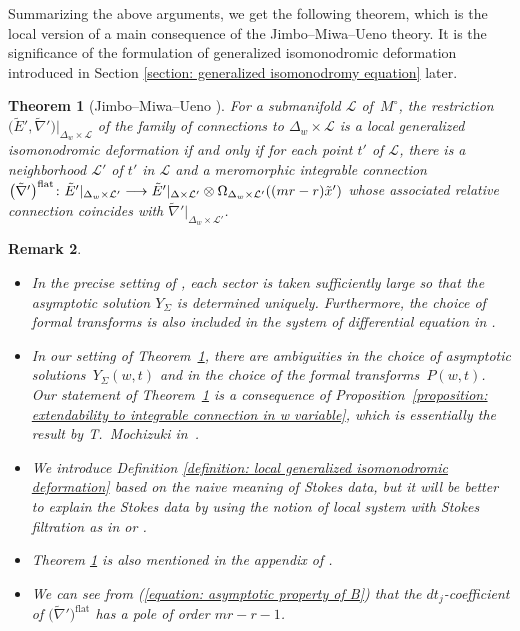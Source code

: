 \documentclass[pdftex]{sigma}
\numberwithin{equation}{section}
\newtheorem{Theorem}{Theorem}[section]
\newtheorem{Remark}[Theorem]{Remark}
\begin{document}
Summarizing the above arguments, we get the following theorem,
which is the local version of a main consequence of the Jimbo--Miwa--Ueno theory.
It is the significance of
the formulation of generalized isomonodromic deformation
introduced in Section \ref{section: generalized isomonodromy equation} later.

\begin{Theorem}[Jimbo--Miwa--Ueno {\cite[Theorems 3.1 and 3.3]{Jimbo-Miwa-Ueno}}]
\label{theorem: Jimbo-Miwa-Ueno equation}
For a submanifold ${\mathcal L}$ of~$M^{\circ}$,
the restriction
$\big(\tilde{E}',\tilde{\nabla}'\big)|_{\Delta_w\times{\mathcal L}}$
of the family of connections to $\Delta_w\times{\mathcal L}$
is a local generalized isomonodromic deformation
if and only if
for each point $t'$ of ${\mathcal L}$, there is a neighborhood ${\mathcal L'}$
of $t'$ in ${\mathcal L}$ and a meromorphic integrable connection
$\big(\tilde{\nabla}'\big)^{\rm flat}\colon \tilde{E}'|_{\Delta_w\times{\mathcal L'}} \longrightarrow
\tilde{E}'|_{\Delta\times{\mathcal L'}}\otimes\Omega_{\Delta_w\times{\mathcal L'}}((mr-r)\tilde{x}')$
whose associated relative connection coincides with
$\tilde{\nabla}'|_{\Delta_w\times{\mathcal L'}}$.
\end{Theorem}

\begin{Remark}\quad
\begin{itemize}\itemsep=0pt
\item[(i)]
In the precise setting of \cite{Jimbo-Miwa-Ueno}, each sector is taken sufficiently large
so that the asymptotic solution $Y_{\Sigma}$ is determined uniquely.
Furthermore, the choice of formal transforms is also included in the system of
differential equation in \cite[Theorems 3.1 and~3.3]{Jimbo-Miwa-Ueno}.
\item[(ii)]
In our setting of Theorem~\ref{theorem: Jimbo-Miwa-Ueno equation},
there are ambiguities in the choice of asymptotic solutions~$Y_{\Sigma}(w,t)$
and in the choice of the formal transforms~$P(w,t)$.
Our statement of Theorem~\ref{theorem: Jimbo-Miwa-Ueno equation}
is a consequence of Proposition~\ref{proposition: extendability to integrable connection in w variable},
which is essentially the result by T.~Mochizuki in~\cite{Mochizuki}.
\item[(iii)] We introduce Definition \ref{definition: local generalized isomonodromic deformation}
based on the naive meaning of Stokes data,
but it will be better to explain the Stokes data by
using the notion of local system with Stokes filtration
as in \cite[Section 4.6]{Babbitt-Varadarajan}
or \cite[Chapter 3]{Mochizuki}.
\item[(iv)]
Theorem \ref{theorem: Jimbo-Miwa-Ueno equation}
is also mentioned in the appendix of \cite{Boalch-1}.
\item[(v)]
We can see from (\ref{equation: asymptotic property of B})
that the $dt_j$-coefficient of $\big(\tilde{\nabla}'\big)^{\mathrm{flat}}$
has a pole of order $mr-r-1$.
\end{itemize}
\end{Remark}
\end{document}
